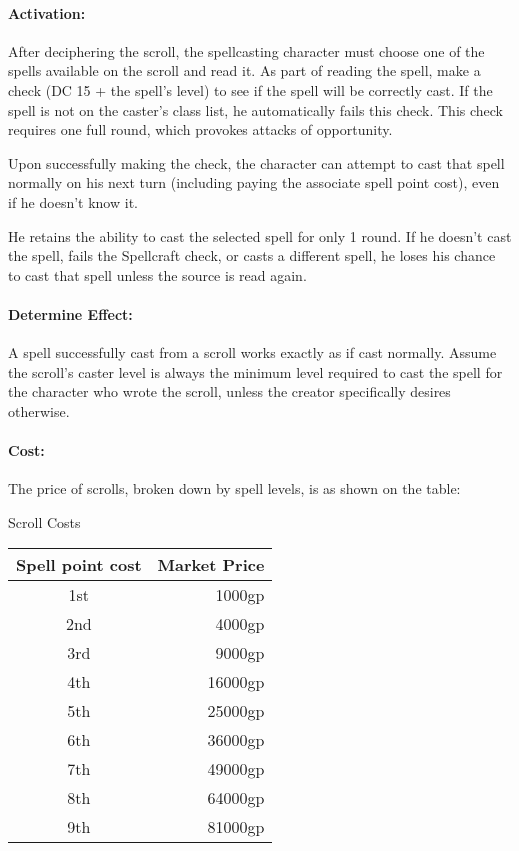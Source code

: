 \paragraph{Activation:} 
After deciphering the scroll, the spellcasting character must choose one of the spells available on the scroll and read it.
As part of reading the spell, make a  check  (DC 15 + the spell's level) to see if the spell will be correctly cast. 
If the spell is not on the caster's class list, he automatically fails this check.
This check requires one full round, which provokes attacks of opportunity.

Upon successfully making the check, the character can attempt to cast that spell normally on his next turn (including paying the associate spell point cost), even if he doesn't know it.
 
He retains the ability to cast the selected spell for only 1 round. 
If he doesn't cast the spell, fails the Spellcraft check, or casts a different spell, 
he loses his chance to cast that spell unless the source is read again.

\paragraph{Determine Effect:} 
A spell successfully cast from a scroll works exactly as if cast normally. 
Assume the scroll's caster level is always the minimum level required to cast the spell for the character who wrote the scroll, unless the creator specifically desires otherwise.

\paragraph{Cost:}
The price of scrolls, broken down by spell levels, is as shown on the  table:
\begin{tableonecolumn}
\caption{Scroll Costs}
\label{tab:ScrollCosts}
\begin{tabular}{cr}
\toprule
\textbf{Spell point cost}&\textbf{Market Price}\\
\midrule
1st&	1000gp\\
2nd&	4000gp\\
3rd&	9000gp\\
4th&	16000gp\\
5th&	25000gp\\
6th&	36000gp\\
7th&	49000gp\\
8th&	64000gp\\
9th&	81000gp\\
\bottomrule
\end{tabular}
\end{tableonecolumn}

